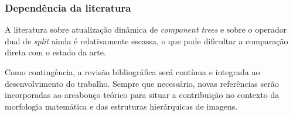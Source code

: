 \subsubsection{Dependência da literatura}

A literatura sobre atualização dinâmica de 
\textit{component trees} e sobre o operador dual de 
\textit{split} ainda é relativamente escassa, 
o que pode dificultar a comparação direta com o 
estado da arte.

Como contingência, a revisão bibliográfica será contínua e 
integrada ao desenvolvimento do trabalho. 
Sempre que necessário, novas referências serão incorporadas 
ao arcabouço teórico para situar a contribuição no 
contexto da morfologia matemática e das estruturas 
hierárquicas de imagens.